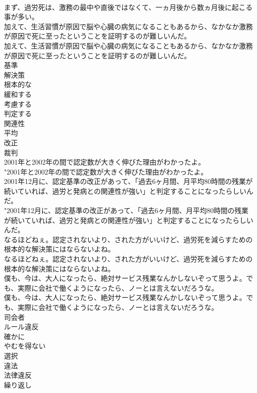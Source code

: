 \documentclass[8pt]{extreport}
\begin{document}
\begin{CJK}{UTF8}{min}
\\	まず、過労死は、激務の最中や直後ではなくて、一ヵ月後から数ヵ月後に起こる事が多い。 
\\	加えて、生活習慣が原因で脳や心臓の病気になることもあるから、なかなか激務が原因で死に至ったということを証明するのが難しいんだ。	
\\	加えて、生活習慣が原因で脳や心臓の病気になることもあるから、なかなか激務が原因で死に至ったということを証明するのが難しいんだ。 
\\	基準
\\	解決策
\\	根本的な
\\	緩和する
\\	考慮する
\\	判定する
\\	関連性
\\	平均
\\	改正
\\	裁判
\\	2001年と2002年の間で認定数が大きく伸びた理由がわかったよ。	
\\	"2001年と2002年の間で認定数が大きく伸びた理由がわかったよ。 
\\	2001年12月に、認定基準の改正があって、「過去6ヶ月間、月平均80時間の残業が続いていれば、過労と発病との関連性が強い」と判定することになったらしいんだ。	
\\	"2001年12月に、認定基準の改正があって、「過去6ヶ月間、月平均80時間の残業が続いていれば、過労と発病との関連性が強い」と判定することになったらしいんだ。 
\\	なるほどねぇ。認定されないより、された方がいいけど、過労死を減らすための根本的な解決策にはならないよね。	
\\	なるほどねぇ。認定されないより、された方がいいけど、過労死を減らすための根本的な解決策にはならないよね。 
\\	僕も、今は、大人になったら、絶対サービス残業なんかしないぞって思うよ。でも、実際に会社で働くようになったら、ノーとは言えないだろうな。	
\\	僕も、今は、大人になったら、絶対サービス残業なんかしないぞって思うよ。でも、実際に会社で働くようになったら、ノーとは言えないだろうな。 
\\	司会者
\\	ルール違反
\\	確かに
\\	やむを得ない
\\	選択
\\	違法
\\	法律違反
\\	繰り返し

\end{CJK}
\end{document}
